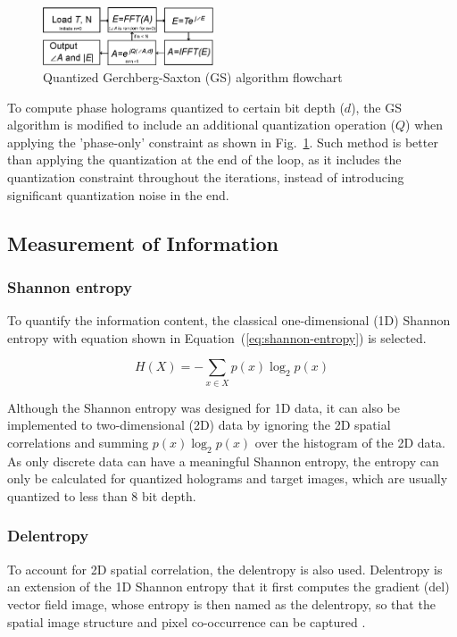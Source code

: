 	\begin{figure} [ht]
	   \begin{center}
	   \includegraphics[width = 0.45\textwidth]{GS_quantized_flowchart.eps}
	   \end{center}
	   \caption{\label{fig:GS_quantized_flowchart} Quantized Gerchberg-Saxton (GS) algorithm flowchart}
	\end{figure}

	To compute phase holograms quantized to certain bit depth ($d$), the GS algorithm is modified to include an additional quantization operation ($Q$) when applying the 'phase-only' constraint as shown in Fig.~\ref{fig:GS_quantized_flowchart}. Such method is better than applying the quantization at the end of the loop, as it includes the quantization constraint throughout the iterations, instead of introducing significant quantization noise in the end.



\subsection{Measurement of Information}
\subsubsection{Shannon entropy}
	To quantify the information content, the classical one-dimensional (1D) Shannon entropy \cite{Shannon1948} with equation shown in Equation~(\ref{eq:shannon-entropy}) is selected.

	\begin{equation}
		H(X) = -\sum_{x\in X} p(x)\log_2p(x)
		\label{eq:shannon-entropy}
	\end{equation}

	Although the Shannon entropy was designed for 1D data, it can also be implemented to two-dimensional (2D) data by ignoring the 2D spatial correlations and summing $p(x)\log_2p(x)$ over the histogram of the 2D data. As only discrete data can have a meaningful Shannon entropy, the entropy can only be calculated for quantized holograms and target images, which are usually quantized to less than 8 bit depth.


\subsubsection{Delentropy} \label{sec:Delentropy}
	To account for 2D spatial correlation, the delentropy \cite{Larkin2016} is also used. Delentropy is an extension of the 1D Shannon entropy that it first computes the gradient (del) vector field image, whose entropy is then named as the delentropy, so that the spatial image structure and pixel co-occurrence can be captured \cite{Larkin2016}.

